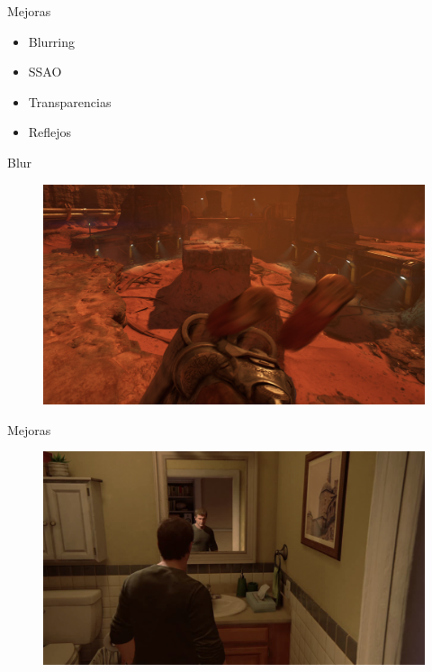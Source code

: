\documentclass[table]{beamer}
\begin{document}
\begin{frame}[fragile]{Mejoras}
    \begin{itemize}
        \item Blurring
        \item SSAO
        \item Transparencias
        \item Reflejos
    \end{itemize}
\end{frame}

\begin{frame}[fragile]{Blur}
    \begin{figure}
        \includegraphics[width=\linewidth]{./figures/doomblur1.png}
    \end{figure}
\end{frame}


\begin{frame}[fragile]{Mejoras}
    \begin{figure}
        \includegraphics[width=\linewidth]{./figures/reflection.png}
    \end{figure}
\end{frame}

\begin{frame}
    \titlepage
\end{frame}
\end{document}
